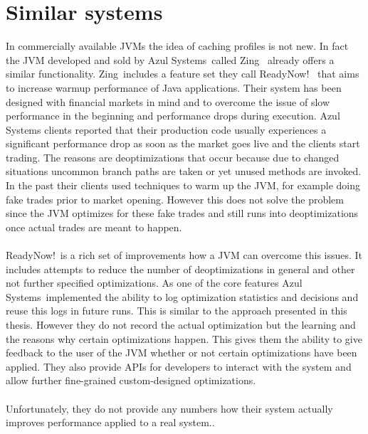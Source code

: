 \section{Similar systems}
\label{s:similarsystems}
In commercially available JVMs the idea of caching profiles is not new.
In fact the JVM developed and sold by Azul Systems\textregistered\ called Zing\textregistered\ \cite{zing} already offers a similar functionality.
Zing\textregistered\ includes a feature set they call ReadyNow!\texttrademark\ \cite{readynow} that aims to increase warmup performance of Java applications.
Their system has been designed with financial markets in mind and to overcome the issue of slow performance in the beginning and performance drops during execution.
Azul Systems clients reported that their production code usually experiences a significant performance drop as soon as the market goes live and the clients start trading.
The reasons are deoptimizations that occur because due to changed situations uncommon branch paths are taken or yet unused methods are invoked.
In the past their clients used techniques to warm up the JVM, for example doing fake trades prior to market opening. However this does not solve the problem since the JVM optimizes for these fake trades and still runs into deoptimizations once actual trades are meant to happen.
\\\\
ReadyNow!\texttrademark\  is a rich set of improvements how a JVM can overcome this issues. It includes attempts to reduce the number of deoptimizations in general and other not further specified optimizations.
As one of the core features Azul Systems\textregistered\ implemented the ability to log optimization statistics and decisions and reuse this logs in future runs. This is similar to the approach presented in this thesis. However they do not record the actual optimization but the learning and the reasons why certain optimizations happen. This gives them the ability to give feedback to the user of the JVM whether or not certain optimizations have been applied. They also provide APIs for developers to interact with the system and allow further fine-grained custom-designed optimizations.
\\\\
Unfortunately, they do not provide any numbers how their system actually improves performance applied to a real system..
